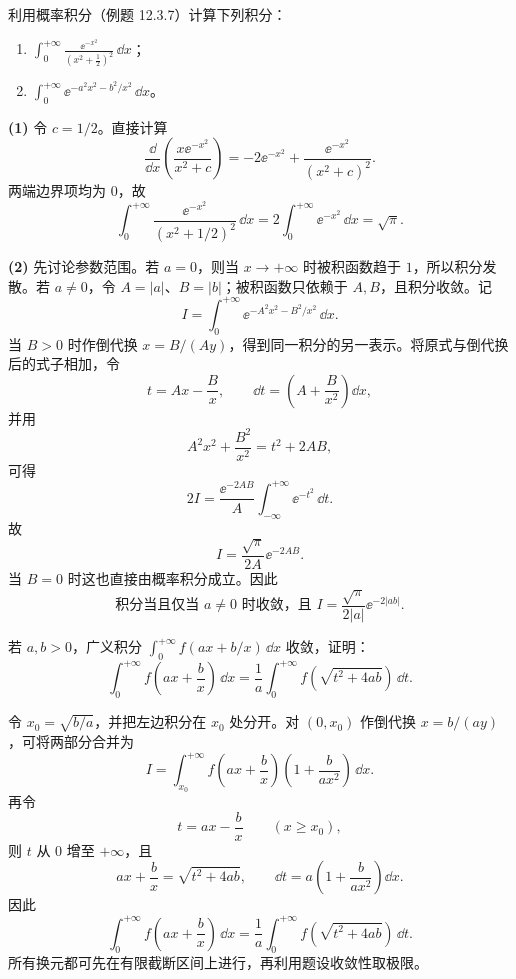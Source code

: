 \begin{xexercise}[6]
利用概率积分（例题 12.3.7）计算下列积分：
  \begin{enumerate}[label=(\arabic*)]
    \item $\displaystyle\int_0^{+\infty}\frac{\ee^{-x^2}}{(x^2+\frac12)^2}\,\dd x$；
    \item $\displaystyle\int_0^{+\infty}\ee^{-a^2x^2-b^2/x^2}\,\dd x$。
  \end{enumerate}
\end{xexercise}
\begin{xsolution}
\textbf{(1)} 令 $c=1/2$。直接计算
\[
  \frac{\dd}{\dd x}\left(\frac{x\ee^{-x^2}}{x^2+c}\right)
  =-2\ee^{-x^2}+\frac{\ee^{-x^2}}{(x^2+c)^2}.
\]
两端边界项均为 $0$，故
\[
  \boxed{\int_0^{+\infty}\frac{\ee^{-x^2}}{(x^2+1/2)^2}\,\dd x
  =2\int_0^{+\infty}\ee^{-x^2}\,\dd x=\sqrt\pi}.
\]

\textbf{(2)} 先讨论参数范围。若 $a=0$，则当 $x\to+\infty$ 时被积函数趋于 $1$，所以积分发散。若 $a\neq0$，令 $A=|a|$、$B=|b|$；被积函数只依赖于 $A,B$，且积分收敛。记
\[
  I=\int_0^{+\infty}\ee^{-A^2x^2-B^2/x^2}\,\dd x.
\]
当 $B>0$ 时作倒代换 $x=B/(Ay)$，得到同一积分的另一表示。将原式与倒代换后的式子相加，令
\[
  t=Ax-\frac Bx,
  \qquad \dd t=\left(A+\frac B{x^2}\right)\dd x,
\]
并用
\[
  A^2x^2+\frac{B^2}{x^2}=t^2+2AB,
\]
可得
\[
  2I=\frac{\ee^{-2AB}}A\int_{-\infty}^{+\infty}\ee^{-t^2}\,\dd t.
\]
故
\[
  I=\frac{\sqrt\pi}{2A}\ee^{-2AB}.
\]
当 $B=0$ 时这也直接由概率积分成立。因此
\[
  \boxed{\text{积分当且仅当 }a\neq0\text{ 时收敛，且 }
  I=\frac{\sqrt\pi}{2|a|}\ee^{-2|ab|}.}
\]
\end{xsolution}


\begin{xexercise}[7]
若 $a,b>0$，广义积分 $\int_0^{+\infty}f(ax+b/x)\,\dd x$ 收敛，证明：
  \[
    \int_0^{+\infty}f\left(ax+\frac bx\right)\,\dd x
    =\frac1a\int_0^{+\infty}f(\sqrt{t^2+4ab})\,\dd t.
  \]
\end{xexercise}
\begin{xsolution}
令 $x_0=\sqrt{b/a}$，并把左边积分在 $x_0$ 处分开。对 $(0,x_0)$ 作倒代换 $x=b/(ay)$，可将两部分合并为
\[
  I=\int_{x_0}^{+\infty}f\left(ax+\frac bx\right)
  \left(1+\frac b{ax^2}\right)\,\dd x.
\]
再令
\[
  t=ax-\frac bx\qquad(x\geq x_0),
\]
则 $t$ 从 $0$ 增至 $+\infty$，且
\[
  ax+\frac bx=\sqrt{t^2+4ab},
  \qquad
  \dd t=a\left(1+\frac b{ax^2}\right)\dd x.
\]
因此
\[
  \boxed{
  \int_0^{+\infty}f\left(ax+\frac bx\right)\,\dd x
  =\frac1a\int_0^{+\infty}f(\sqrt{t^2+4ab})\,\dd t.}
\]
所有换元都可先在有限截断区间上进行，再利用题设收敛性取极限。
\end{xsolution}


